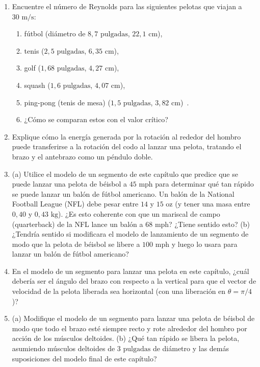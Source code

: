 \documentclass[12pt]{book}
\begin{document}
\begin{enumerate}
\item[3.76] Encuentre el número de Reynolds para las siguientes pelotas que viajan a $30\text{ m/s}$:
\begin{enumerate}
\item[(a)] fútbol (diámetro de $8{,}7\text{ pulgadas}$, $22{,}1\text{ cm}$),
\item[(b)] tenis ($2{,}5\text{ pulgadas}$, $6{,}35\text{ cm}$),
\item[(c)] golf ($1{,}68\text{ pulgadas}$, $4{,}27\text{ cm}$),
\item[(d)] squash ($1{,}6\text{ pulgadas}$, $4{,}07\text{ cm}$),
\item[(e)] ping-pong (tenis de mesa) ($1{,}5\text{ pulgadas}$, $3{,}82\text{ cm}$)~\cite{ref36}.
\item[(f)] ¿Cómo se comparan estos con el valor crítico?
\end{enumerate}

\item[3.77] Explique cómo la energía generada por la rotación al rededor del hombro puede transferirse a la rotación del codo al lanzar una pelota, tratando el brazo y el antebrazo como un péndulo doble.

\item[3.78] (a) Utilice el modelo de un segmento de este capítulo que predice que se puede lanzar una pelota de béisbol a $45\text{ mph}$ para determinar qué tan rápido se puede lanzar un balón de fútbol americano. Un balón de la National Football League (NFL) debe pesar entre $14$ y $15\text{ oz}$ (y tener una masa entre $0{,}40$ y $0{,}43\text{ kg}$). ¿Es esto coherente con que un mariscal de campo (quarterback) de la NFL lance un balón a $68\text{ mph}$? ¿Tiene sentido esto?
\newline
(b) ¿Tendría sentido si modificara el modelo de lanzamiento de un segmento de modo que la pelota de béisbol se libere a $100\text{ mph}$ y luego lo usara para lanzar un balón de fútbol americano?

\item[3.79] En el modelo de un segmento para lanzar una pelota en este capítulo, ¿cuál debería ser el ángulo del brazo con respecto a la vertical para que el vector de velocidad de la pelota liberada sea horizontal (con una liberación en $\theta = \pi/4$)?

\item[3.80] (a) Modifique el modelo de un segmento para lanzar una pelota de béisbol de modo que todo el brazo esté siempre recto y rote alrededor del hombro por acción de los músculos deltoides.
\newline
(b) ¿Qué tan rápido se libera la pelota, asumiendo músculos deltoides de $3\text{ pulgadas}$ de diámetro y las demás suposiciones del modelo final de este capítulo?


\end{enumerate}
\end{document}
